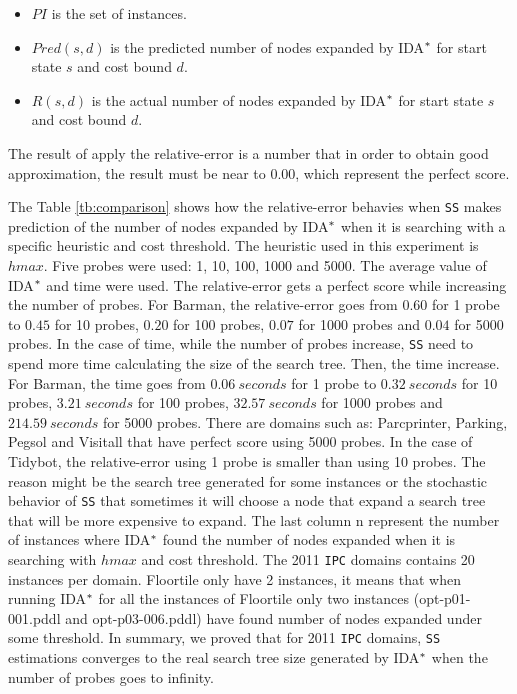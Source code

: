 \begin{itemize}
  \item $PI$ is the set of instances.
  \item $Pred(s,d)$ is the predicted number of nodes expanded by IDA$\sp{*}$ for start state $s$ and cost bound $d$.
  \item $R(s,d)$ is the actual number of nodes expanded by IDA$\sp{*}$ for start state $s$ and cost bound $d$.
\end{itemize}

The result of apply the relative-error is a number that in order to obtain good approximation, the result must be near to $0.00$, which represent the perfect score.

The Table \ref{tb:comparison} shows how the relative-error behavies when \texttt{SS} makes prediction of the number of nodes expanded by IDA$\sp{*}$ when it is searching with a specific heuristic and cost threshold. The heuristic used in this experiment is $hmax$. Five probes were used: 1, 10, 100, 1000 and 5000. The average value of IDA$\sp{*}$ and time were used. The relative-error gets a perfect score while increasing the number of probes. For Barman, the relative-error goes from $0.60$ for 1 probe to $0.45$ for 10 probes, $0.20$ for 100 probes, $0.07$ for 1000 probes and $0.04$ for 5000 probes. In the case of time, while the number of probes increase, \texttt{SS} need to spend more time calculating the size of the search tree. Then, the time increase. For Barman, the time goes from $0.06\ seconds$ for 1 probe to $0.32\ seconds$ for 10 probes, $3.21\ seconds$ for 100 probes, $32.57\ seconds$ for 1000 probes and $214.59\ seconds$ for 5000 probes. There are domains such as: Parcprinter, Parking, Pegsol and Visitall that have perfect score using 5000 probes. In the case of Tidybot, the relative-error using 1 probe is smaller than using 10 probes. The reason might be the search tree generated for some instances or the stochastic behavior of \texttt{SS} that sometimes it will choose a node that expand a search tree that will be more expensive to expand. The last column \textsf{n} represent the number of instances where IDA$\sp{*}$ found the number of nodes expanded when it is searching with $hmax$ and cost threshold. The 2011 \texttt{IPC} domains contains 20 instances per domain. Floortile only have 2 instances, it means that when running IDA$\sp{*}$ for all the instances of Floortile only two instances (opt-p01-001.pddl and opt-p03-006.pddl) have found number of nodes expanded under some threshold. In summary, we proved that for 2011 \texttt{IPC} domains, \texttt{SS} estimations converges to the real search tree size generated by IDA$\sp{*}$ when the number of probes goes to infinity.


